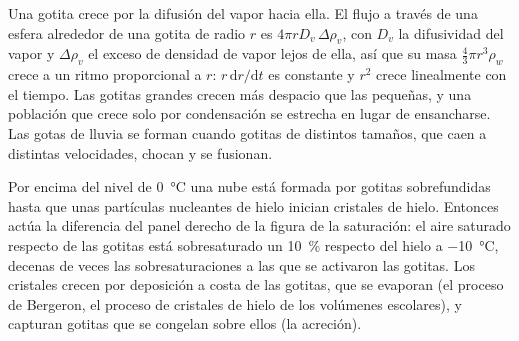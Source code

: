 \begin{remark}\label{rem:b2:atmospheric-thermodynamics:growth}
Una gotita crece por la difusión del vapor hacia ella. El flujo a través de una esfera alrededor de una gotita
de radio $r$ es $4\pi r D_v\,\Delta\rho_v$, con $D_v$ la difusividad del vapor y
$\Delta\rho_v$ el exceso de densidad de vapor lejos de ella, así que su masa $\tfrac43\pi r^3\rho_w$ crece
a un ritmo proporcional a $r$: $r\,\mathrm{d}r/\mathrm{d}t$ es constante y $r^2$ crece linealmente con el
tiempo. Las gotitas grandes crecen más despacio que las pequeñas, y una población que crece solo por
condensación se estrecha en lugar de ensancharse. Las gotas de lluvia se forman cuando gotitas de distintos tamaños, que caen a
distintas velocidades, chocan y se fusionan.
\end{remark}

Por encima del nivel de \qty{0}{\celsius} una nube está formada por gotitas sobrefundidas hasta que unas partículas
nucleantes de hielo inician cristales de hielo. Entonces actúa la diferencia del panel derecho de la
figura de la saturación: el aire saturado respecto de las gotitas está sobresaturado un \qty{10}{\percent} respecto del
hielo a \qty{-10}{\celsius}, decenas de veces las sobresaturaciones a las que se activaron las gotitas.
Los cristales crecen por deposición a costa de las gotitas, que se evaporan (el proceso
de Bergeron, el proceso de cristales de hielo de los volúmenes escolares), y capturan gotitas que se congelan
sobre ellos (la acreción).

